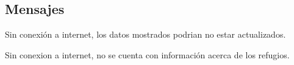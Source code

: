 \subsection{Mensajes}

\begin{Citemize}
	\item Sin conexión a internet, los datos mostrados podrian no estar actualizados.
	\item Sin conexion a internet, no se cuenta con información acerca de los refugios.
\end{Citemize}

\clearpage